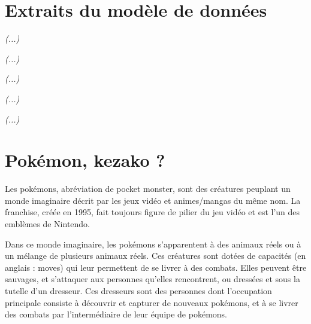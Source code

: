 \chapter{Extraits du modèle de données}
\label{chap:annexeA}
\hspace{0pt}


\emph{(...)}



\emph{(...)}



\emph{(...)}



\emph{(...)}



\emph{(...)}


\chapter{Pokémon, kezako ?}
\label{chap:annexeB}
\hspace{0pt}

Les pokémons, abréviation de pocket monster, sont des créatures peuplant un monde imaginaire décrit par les jeux vidéo et animes/mangas du même nom. La franchise, créée en 1995, fait toujours figure de pilier du jeu vidéo et est l'un des emblèmes de Nintendo.

Dans ce monde imaginaire, les pokémons s'apparentent à des animaux réels ou à un mélange de plusieurs animaux réels. Ces créatures sont dotées de capacités (en anglais : moves) qui leur permettent de se livrer à des combats. Elles peuvent être sauvages, et s’attaquer aux personnes qu’elles rencontrent, ou dressées et sous la tutelle d’un dresseur. Ces dresseurs sont des personnes dont l’occupation principale consiste à découvrir et capturer de nouveaux pokémons, et à se livrer des combats par l’intermédiaire de leur équipe de pokémons.

